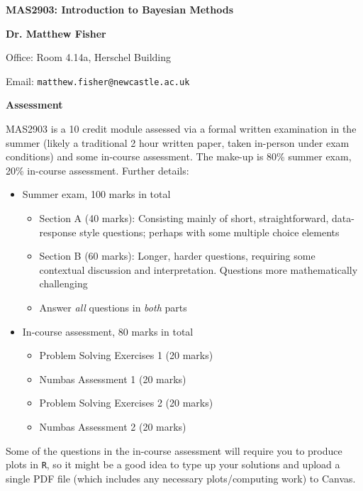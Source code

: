 



\Large
\textbf{\color{verydarkred}MAS2903: Introduction to  Bayesian Methods}


\large
\textbf{Dr. Matthew Fisher}


\normalsize

Office: \textsf{Room 4.14a, Herschel Building}



Email: \texttt{matthew.fisher@newcastle.ac.uk} 






\normalsize












\noindent \textbf{\color{verydarkred}Assessment}

MAS2903 is a 10 credit module assessed via a formal written examination in the summer (likely a traditional 2 hour written paper, taken in-person under exam conditions) and some in-course assessment.  The make-up is 80\% summer exam, 20\% in-course assessment.  Further details:
\begin{itemize}
\item Summer exam, 100 marks in total
\begin{itemize}
\item Section A (40 marks): Consisting mainly of short, straightforward, data-response style questions; perhaps with some multiple choice elements
\item Section B (60 marks): Longer, harder questions, requiring some contextual discussion and interpretation.  Questions more mathematically challenging
\item Answer \textit{all} questions in \textit{both} parts
\end{itemize}

\item In-course assessment, 80 marks in total
\begin{itemize}
\item Problem Solving Exercises 1 (20 marks)
\item Numbas Assessment 1 (20 marks)
\item Problem Solving Exercises 2 (20 marks)
\item Numbas Assessment 2 (20 marks)
\end{itemize}
\end{itemize}
 Some of the questions in the in-course assessment will require you to produce plots in \texttt{R}, so it might be a good idea to type up your solutions and upload a single PDF file (which includes any necessary plots/computing work) to Canvas.

